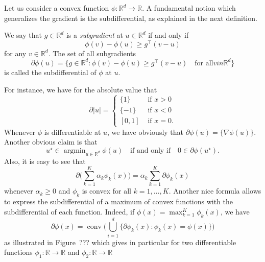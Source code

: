 \documentclass[
	fontsize=11pt, %
	twoside=false, %
	numbers=noenddot, %
]{kaobook}
\DeclareMathOperator*{\argmin}{argmin}
\newcommand{\R}{\mathbb R}
\newcommand{\grad}{\nabla}
\DeclareMathOperator{\conv}{conv}
\begin{document}
Let us consider a convex function $\phi : \R^d \rightarrow \R$.
A fundamental notion which generalizes the gradient is the subdifferential, as explained in the next definition.
\begin{definition}
	\label{def:subdifferential}
	We say that $g \in \R^d$ is a \emph{subgradient} at $u \in \R^d$ if and only if
	\begin{equation}
	 	\phi(v) - \phi(u) \geq g^\top (v - u)
	 \end{equation} 
	 for any $v \in \R^d$.
	 The set of all subgradients
	 \begin{equation*}
	 	\partial \phi(u) = \{ g \in \R^d : \phi(v) - \phi(u) \geq g^\top (v -u) \quad \text{for all} v in \R^d \}
	 \end{equation*}
	 is called the subdifferential of $\phi$ at $u$.
\end{definition}
For instance, we have for the absolute value that
\begin{equation*}
	\partial |u| = 
	\begin{cases}
		\{ 1 \} &\text{ if } x  > 0 \\
		\{ -1 \} &\text{ if } x < 0 \\
		[0, 1] &\text{ if } x  = 0.
	\end{cases}
\end{equation*}
Whenever $\phi$ is differentiable at $u$, we have obviously that $\partial \phi(u) = \{  \grad \phi(u) \}$.
Another obvious%
claim is that
\begin{equation*}
	u^\star \in \argmin_{u \in \R^d} \phi(u) \quad \text{if and only if} \quad 0 \in \partial \phi(u^\star).
\end{equation*}
Also, it is easy to see that
\begin{equation*}
	\partial \Big( \sum_{k=1}^K \alpha_k \phi_k(x) \Big) =  \alpha_k \sum_{k=1}^K \partial \phi_k(x)
\end{equation*}
whenever $\alpha_k \geq 0$ and $\phi_k$ is convex for all $k=1, \ldots, K$.
Another nice formula allows to express the subdifferential of a maximum of convex functions with the subdifferential of each function.
Indeed, if $\phi(x) = \max_{k=1}^K \phi_k(x)$, we have
\begin{equation*}
	\partial \phi(x) = \conv\Big( \bigcup_{i=1}^d \Big\{ \partial \phi_k(x) : \phi_k(x) = \phi(x) \Big\} \Big)
\end{equation*}
as illustrated in Figure~???
which gives in particular for two differentiable functions $\phi_1 : \R \rightarrow \R$ and $\phi_2 : \R \rightarrow \R$
\end{document}

